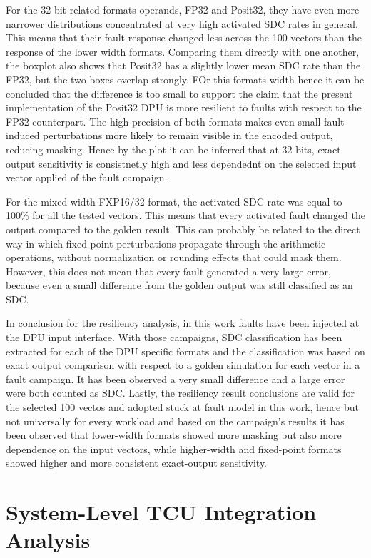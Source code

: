 For the 32 bit related formats operands, FP32 and Posit32, they have even more narrower distributions concentrated at very high activated SDC rates in general. This means that their fault response changed less across the 100 vectors than the response  of the lower width formats. Comparing them directly with one another, the boxplot also shows that Posit32 has a slightly lower mean SDC rate than the FP32, but the two boxes overlap strongly.  FOr this formats width hence it can be concluded that the difference is too small to support the claim that the present implementation of the Posit32 DPU is more resilient to faults with respect to the FP32 counterpart. The high precision of both formats makes even small fault-induced perturbations more likely to remain visible in the encoded output, reducing masking. Hence by the plot it can be inferred that at 32 bits, exact output sensitivity is consistnetly high and less dependednt on the selected input vector applied of the fault campaign.

For the mixed width FXP16/32 format, the activated SDC rate was equal to 100\% for all the tested vectors. This means that every activated fault changed the output compared to the golden result. This can probably be related to the direct way in which fixed-point perturbations propagate through the arithmetic operations, without normalization or rounding effects that could mask them. However, this does not mean that every fault generated a very large error, because even a small difference from the golden output was still classified as an SDC.

In conclusion for the resiliency analysis, in this work faults have been injected at the DPU input interface. With those campaigns, SDC classification has been extracted for each of the DPU specific formats and the classification was based on exact output comparison with respect to a golden simulation for each vector in a fault campaign. It has been observed a very small difference and a large error were both counted as SDC. Lastly, the resiliency result conclusions are valid for the selected 100 vectos and adopted stuck at fault model in this work, hence but not universally for every workload and based on the campaign's results it has been observed that lower-width formats showed more masking but also more dependence on the input vectors, while higher-width and fixed-point formats showed higher and more consistent exact-output sensitivity.

\section{System-Level TCU Integration Analysis}

